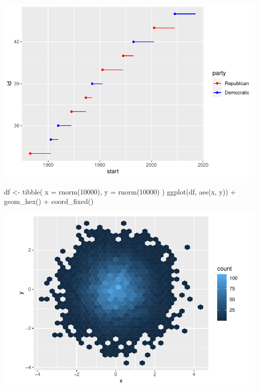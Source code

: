 \documentclass[
]{article}
\newenvironment{Shaded}{\begin{snugshade}}{\end{snugshade}}
\newcommand{\AttributeTok}[1]{\textcolor[rgb]{0.77,0.63,0.00}{#1}}
\newcommand{\DecValTok}[1]{\textcolor[rgb]{0.00,0.00,0.81}{#1}}
\newcommand{\FunctionTok}[1]{\textcolor[rgb]{0.00,0.00,0.00}{#1}}
\newcommand{\NormalTok}[1]{#1}
\newcommand{\OtherTok}[1]{\textcolor[rgb]{0.56,0.35,0.01}{#1}}
\newcommand{\SpecialCharTok}[1]{\textcolor[rgb]{0.00,0.00,0.00}{#1}}
\begin{document}
\includegraphics{Journal_files/figure-latex/unnamed-chunk-60-1.pdf}

\begin{Shaded}
\begin{Highlighting}[]
\NormalTok{df }\OtherTok{\textless{}{-}} \FunctionTok{tibble}\NormalTok{(}
  \AttributeTok{x =} \FunctionTok{rnorm}\NormalTok{(}\DecValTok{10000}\NormalTok{),}
  \AttributeTok{y =} \FunctionTok{rnorm}\NormalTok{(}\DecValTok{10000}\NormalTok{)}
\NormalTok{)}
\FunctionTok{ggplot}\NormalTok{(df, }\FunctionTok{aes}\NormalTok{(x, y)) }\SpecialCharTok{+}
  \FunctionTok{geom\_hex}\NormalTok{() }\SpecialCharTok{+}
  \FunctionTok{coord\_fixed}\NormalTok{()}
\end{Highlighting}
\end{Shaded}

\includegraphics{Journal_files/figure-latex/unnamed-chunk-60-2.pdf}
\end{document}

